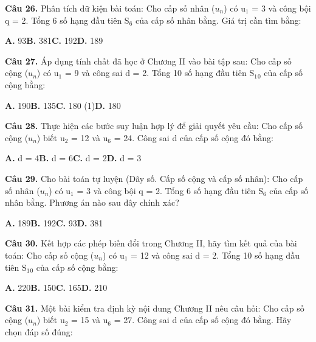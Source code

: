 \documentclass[11pt,a4paper]{article}
\begin{document}
\textbf{\color{primary} Câu 26.} Phân tích dữ kiện bài toán: Cho cấp số nhân ($u_n$) có u$_1$ = 3 và công bội q = 2. Tổng 6 số hạng đầu tiên S$_6$ của cấp số nhân bằng. Giá trị cần tìm bằng:\par
\hspace*{1.5em}\textbf{A.} 93\quad\quad \textbf{B.} 381\quad\quad \textbf{C.} 192\quad\quad \textbf{D.} 189\par\vspace{2pt}
\textbf{\color{primary} Câu 27.} Áp dụng tính chất đã học ở Chương II vào bài tập sau: Cho cấp số cộng ($u_n$) có u$_1$ = 9 và công sai d = 2. Tổng 10 số hạng đầu tiên S$_1$$_0$ của cấp số cộng bằng:\par
\hspace*{1.5em}\textbf{A.} 190\quad\quad \textbf{B.} 135\quad\quad \textbf{C.} 180 (1)\quad\quad \textbf{D.} 180\par\vspace{2pt}
\textbf{\color{primary} Câu 28.} Thực hiện các bước suy luận hợp lý để giải quyết yêu cầu: Cho cấp số cộng ($u_n$) biết u$_2$ = 12 và u$_6$ = 24. Công sai d của cấp số cộng đó bằng:\par
\hspace*{1.5em}\textbf{A.} d = 4\quad\quad \textbf{B.} d = 6\quad\quad \textbf{C.} d = 2\quad\quad \textbf{D.} d = 3\par\vspace{2pt}
\textbf{\color{primary} Câu 29.} Cho bài toán tự luyện (Dãy số. Cấp số cộng và cấp số nhân): Cho cấp số nhân ($u_n$) có u$_1$ = 3 và công bội q = 2. Tổng 6 số hạng đầu tiên S$_6$ của cấp số nhân bằng. Phương án nào sau đây chính xác?\par
\hspace*{1.5em}\textbf{A.} 189\quad\quad \textbf{B.} 192\quad\quad \textbf{C.} 93\quad\quad \textbf{D.} 381\par\vspace{2pt}
\textbf{\color{primary} Câu 30.} Kết hợp các phép biến đổi trong Chương II, hãy tìm kết quả của bài toán: Cho cấp số cộng ($u_n$) có u$_1$ = 12 và công sai d = 2. Tổng 10 số hạng đầu tiên S$_1$$_0$ của cấp số cộng bằng:\par
\hspace*{1.5em}\textbf{A.} 220\quad\quad \textbf{B.} 150\quad\quad \textbf{C.} 165\quad\quad \textbf{D.} 210\par\vspace{2pt}
\textbf{\color{primary} Câu 31.} Một bài kiểm tra định kỳ nội dung Chương II nêu câu hỏi: Cho cấp số cộng ($u_n$) biết u$_2$ = 15 và u$_6$ = 27. Công sai d của cấp số cộng đó bằng. Hãy chọn đáp số đúng:\par
\end{document}
